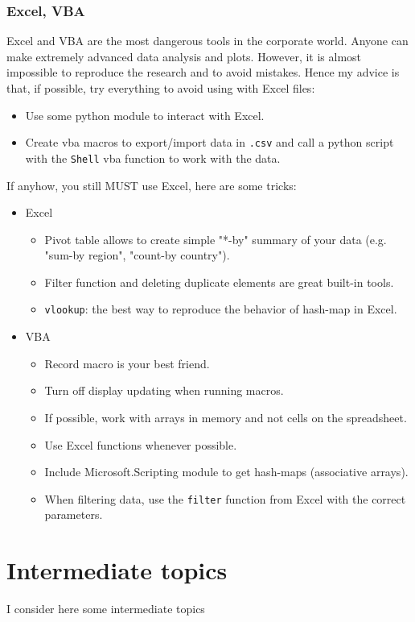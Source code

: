 \documentclass[11pt]{article}
\begin{document}
\subsubsection{Excel, VBA}
\label{sec:orgdbf667e}
Excel and VBA are the most dangerous tools in the corporate world. Anyone
can make extremely advanced data analysis and plots. However, it is almost
impossible to reproduce the research and to avoid mistakes. Hence my advice
is that, if possible, try everything to avoid using with Excel files:
\begin{itemize}
\item Use some python module to interact with Excel.
\item Create vba macros to export/import data in \texttt{.csv} and call a python
script with the \texttt{Shell} vba function to work with the data.
\end{itemize}

If anyhow, you still MUST use Excel, here are some tricks:
\begin{itemize}
\item Excel
\begin{itemize}
\item Pivot table allows to create simple "*-by" summary of your data
(e.g. "sum-by region", "count-by country").
\item Filter function and deleting duplicate elements are great built-in
tools.
\item \texttt{vlookup}: the best way to reproduce the behavior of hash-map in Excel.
\end{itemize}
\item VBA
\begin{itemize}
\item Record macro is your best friend.
\item Turn off display updating when running macros.
\item If possible, work with arrays in memory and not cells on the
spreadsheet.
\item Use Excel functions whenever possible.
\item Include Microsoft.Scripting module to get hash-maps (associative
arrays).
\item When filtering data, use the \texttt{filter} function from Excel with the
correct parameters.
\end{itemize}
\end{itemize}

\section{Intermediate topics}
\label{sec:orgd859b7e}
I consider here some intermediate topics
\end{document}
